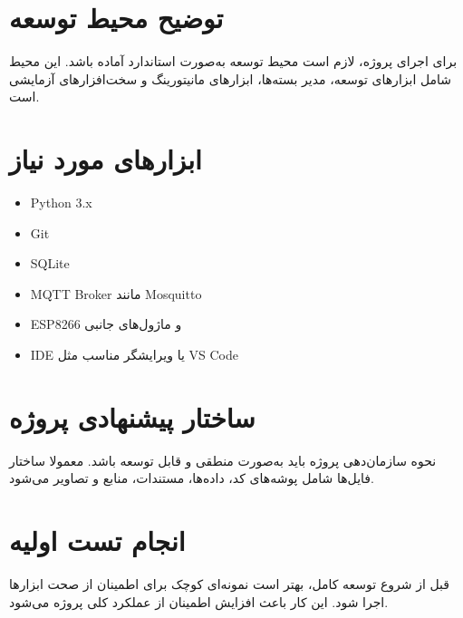\section{توضیح محیط توسعه}

برای اجرای پروژه، لازم است محیط توسعه به‌صورت استاندارد آماده باشد. این محیط شامل ابزارهای توسعه، مدیر بسته‌ها، ابزارهای مانیتورینگ و سخت‌افزارهای آزمایشی است.

\section{ابزارهای مورد نیاز}

\begin{itemize}
    \item Python 3.x
    \item Git
    \item SQLite
    \item MQTT Broker مانند Mosquitto
    \item ESP8266 و ماژول‌های جانبی
    \item IDE یا ویرایشگر مناسب مثل VS Code
\end{itemize}

\section{ساختار پیشنهادی پروژه}

نحوه سازمان‌دهی پروژه باید به‌صورت منطقی و قابل توسعه باشد. معمولا ساختار فایل‌ها شامل پوشه‌های کد، داده‌ها، مستندات، منابع و تصاویر می‌شود.

\section{انجام تست اولیه}

قبل از شروع توسعه کامل، بهتر است نمونه‌ای کوچک برای اطمینان از صحت ابزارها اجرا شود. این کار باعث افزایش اطمینان از عملکرد کلی پروژه می‌شود.

